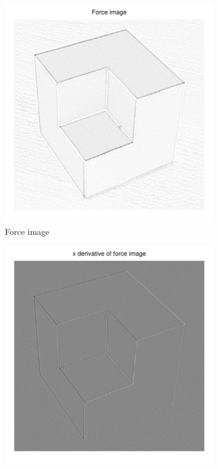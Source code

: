 \documentclass[11pt,a4paper]{article}
\begin{document}
\begin{figure}[H]
\begin{subfigure}[t]{0.24\textwidth}
        \includegraphics[width=\textwidth]{src/images/cubic_log_forces.pdf}
        \caption{Force image}
        \label{fig:cubic_log_forces}
    \end{subfigure}
    \begin{subfigure}[t]{0.24\textwidth}
        \includegraphics[width=\textwidth]{src/images/cubic_log_xforces.pdf}

\end{subfigure}
\end{figure}
\end{document}
